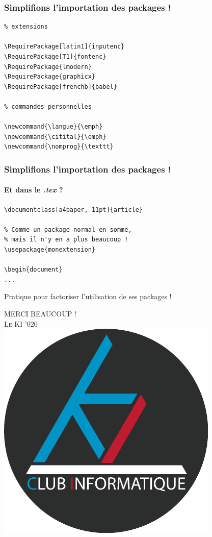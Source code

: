 \documentclass[handout]{beamer}
\begin{document}
\begin{frame}[fragile=singleslide]
\frametitle{Simplifions l'importation des packages !}
\begin{verbatim}
% extensions

\RequirePackage[latin1]{inputenc}
\RequirePackage[T1]{fontenc}
\RequirePackage{lmodern}
\RequirePackage{graphicx}
\RequirePackage[frenchb]{babel}

% commandes personnelles

\newcommand{\langue}{\emph} 
\newcommand{\citital}{\emph} 
\newcommand{\nomprog}{\texttt}
\end{verbatim}
\end{frame}

\begin{frame}[fragile=singleslide]
\frametitle{Simplifions l'importation des packages !}
\framesubtitle{Et dans le \textit{.tex} ?}
\begin{verbatim}
\documentclass[a4paper, 11pt]{article}

% Comme un package normal en somme, 
% mais il n'y en a plus beaucoup !
\usepackage{monextension} 

\begin{document}
...
\end{verbatim}


\centering 
Pratique pour factoriser l'utilisation de ses packages !

\end{frame}


\begin{frame}
	\centering
	\Huge
	\textsc{MERCI BEAUCOUP !}\\
	\vspace*{2cm}
	\normalsize
	\textsc{Le KI '020}\\
	\vspace*{1cm}
	\centering
	\includegraphics[scale=0.2]{logo-ki.png}
\end{frame}
\end{document}
